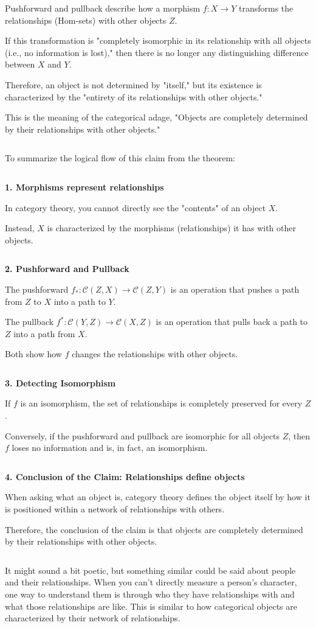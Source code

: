 \documentclass[uplatex,a4j,12pt,dvipdfmx]{jsarticle}
\begin{document}
Pushforward and pullback describe how a morphism $f: X \to Y$ transforms the relationships (Hom-sets) with other objects $Z$.

If this transformation is "completely isomorphic in its relationship with all objects (i.e., no information is lost)," then there is no longer any distinguishing difference between $X$ and $Y$.

Therefore, an object is not determined by "itself," but its existence is characterized by the "entirety of its relationships with other objects."

This is the meaning of the categorical adage, "Objects are completely determined by their relationships with other objects."

${}$

To summarize the logical flow of this claim from the theorem:

${}$

{\bf 1. Morphisms represent relationships}

In category theory, you cannot directly see the "contents" of an object $X$.

Instead, $X$ is characterized by the morphisms (relationships) it has with other objects.

${}$

{\bf 2. Pushforward and Pullback}

The pushforward $f_{*} : \mathcal{C}(Z,X) \to \mathcal{C}(Z,Y)$ is an operation that pushes a path from $Z$ to $X$ into a path to $Y$.

The pullback $f^{*} :\mathcal{C}(Y,Z) \to \mathcal{C}(X,Z)$ is an operation that pulls back a path to $Z$ into a path from $X$.

Both show how $f$ changes the relationships with other objects.

${}$

{\bf 3. Detecting Isomorphism}

If $f$ is an isomorphism, the set of relationships is completely preserved for every $Z$.

Conversely, if the pushforward and pullback are isomorphic for all objects $Z$, then $f$ loses no information and is, in fact, an isomorphism.

${}$

{\bf 4. Conclusion of the Claim: Relationships define objects}

When asking what an object is, category theory defines the object itself by how it is positioned within a network of relationships with others.

Therefore, the conclusion of the claim is that objects are completely determined by their relationships with other objects.

${}$

It might sound a bit poetic, but something similar could be said about people and their relationships.
When you can't directly measure a person's character, one way to understand them is through who they have relationships with and what those relationships are like.
This is similar to how categorical objects are characterized by their network of relationships.
\end{document}
